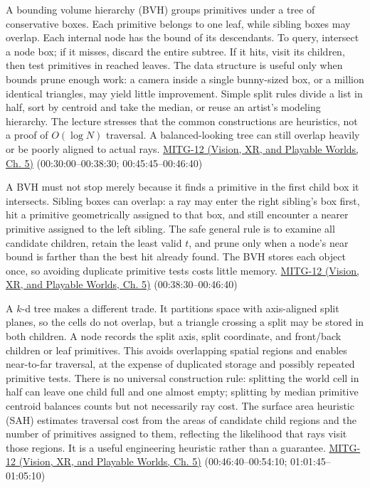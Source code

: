 A bounding volume hierarchy (BVH) groups primitives under a tree of conservative boxes. Each primitive belongs to one leaf, while sibling boxes may overlap. Each internal node has the bound of its descendants. To query, intersect a node box; if it misses, discard the entire subtree. If it hits, visit its children, then test primitives in reached leaves. The data structure is useful only when bounds prune enough work: a camera inside a single bunny-sized box, or a million identical triangles, may yield little improvement. Simple split rules divide a list in half, sort by centroid and take the median, or reuse an artist's modeling hierarchy. The lecture stresses that the common constructions are heuristics, not a proof of \(O(\log N)\) traversal. A balanced-looking tree can still overlap heavily or be poorly aligned to actual rays. \href{../07-Vision-XR-and-Playable-Worlds/main.pdf\#nameddest=04-visual-computing-ii-ch036-mitg-12---ray-tracing-ii}{MITG-12 (Vision, XR, and Playable Worlds, Ch. 5)} (00:30:00--00:38:30; 00:45:45--00:46:40)

A BVH must not stop merely because it finds a primitive in the first child box it intersects. Sibling boxes can overlap: a ray may enter the right sibling's box first, hit a primitive geometrically assigned to that box, and still encounter a nearer primitive assigned to the left sibling. The safe general rule is to examine all candidate children, retain the least valid \(t\), and prune only when a node's near bound is farther than the best hit already found. The BVH stores each object once, so avoiding duplicate primitive tests costs little memory. \href{../07-Vision-XR-and-Playable-Worlds/main.pdf\#nameddest=04-visual-computing-ii-ch036-mitg-12---ray-tracing-ii}{MITG-12 (Vision, XR, and Playable Worlds, Ch. 5)} (00:38:30--00:46:40)

A \(k\)-d tree makes a different trade. It partitions space with axis-aligned split planes, so the cells do not overlap, but a triangle crossing a split may be stored in both children. A node records the split axis, split coordinate, and front/back children or leaf primitives. This avoids overlapping spatial regions and enables near-to-far traversal, at the expense of duplicated storage and possibly repeated primitive tests. There is no universal construction rule: splitting the world cell in half can leave one child full and one almost empty; splitting by median primitive centroid balances counts but not necessarily ray cost. The surface area heuristic (SAH) estimates traversal cost from the areas of candidate child regions and the number of primitives assigned to them, reflecting the likelihood that rays visit those regions. It is a useful engineering heuristic rather than a guarantee. \href{../07-Vision-XR-and-Playable-Worlds/main.pdf\#nameddest=04-visual-computing-ii-ch036-mitg-12---ray-tracing-ii}{MITG-12 (Vision, XR, and Playable Worlds, Ch. 5)} (00:46:40--00:54:10; 01:01:45--01:05:10)

